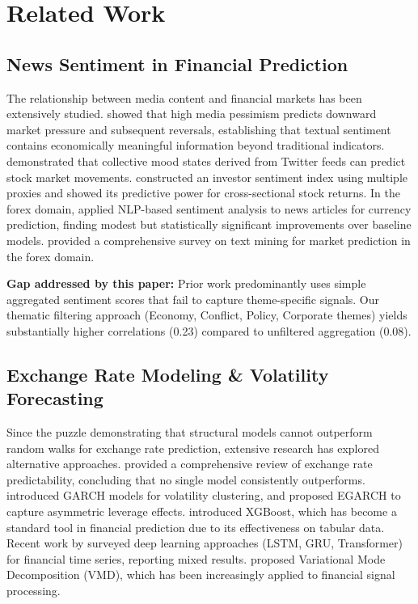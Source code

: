 \documentclass[11pt]{article}
\begin{document}
\section{Related Work}
\label{sec:related}

\subsection{News Sentiment in Financial Prediction}

The relationship between media content and financial markets has been extensively studied. \citet{tetlock2007} showed that high media pessimism predicts downward market pressure and subsequent reversals, establishing that textual sentiment contains economically meaningful information beyond traditional indicators. \citet{bollen2011} demonstrated that collective mood states derived from Twitter feeds can predict stock market movements. \citet{baker2007} constructed an investor sentiment index using multiple proxies and showed its predictive power for cross-sectional stock returns. In the forex domain, \citet{wu2020sentiment} applied NLP-based sentiment analysis to news articles for currency prediction, finding modest but statistically significant improvements over baseline models. \citet{nassirtoussi2014} provided a comprehensive survey on text mining for market prediction in the forex domain.

\textbf{Gap addressed by this paper:} Prior work predominantly uses simple aggregated sentiment scores that fail to capture theme-specific signals. Our thematic filtering approach (Economy, Conflict, Policy, Corporate themes) yields substantially higher correlations (0.23) compared to unfiltered aggregation (0.08).

\subsection{Exchange Rate Modeling \& Volatility Forecasting}

Since the \citet{meese1983} puzzle demonstrating that structural models cannot outperform random walks for exchange rate prediction, extensive research has explored alternative approaches. \citet{rossi2013} provided a comprehensive review of exchange rate predictability, concluding that no single model consistently outperforms. \citet{bollerslev1986} introduced GARCH models for volatility clustering, and \citet{nelson1991} proposed EGARCH to capture asymmetric leverage effects. \citet{chen2016xgboost} introduced XGBoost, which has become a standard tool in financial prediction due to its effectiveness on tabular data. Recent work by \citet{sezer2020} surveyed deep learning approaches (LSTM, GRU, Transformer) for financial time series, reporting mixed results. \citet{dragomiretskiy2014} proposed Variational Mode Decomposition (VMD), which has been increasingly applied to financial signal processing.
\end{document}
